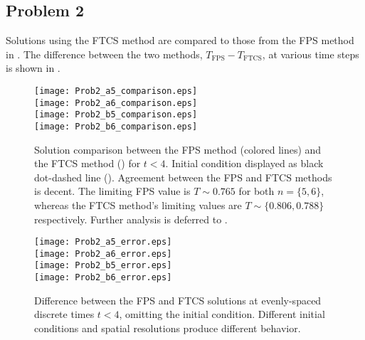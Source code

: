 \documentclass[11pt]{article}
\begin{document}
\subsection{Problem 2}

Solutions using the FTCS method are compared to those from the FPS method in . The difference between the two methods, $T_\text{FPS} - T_\text{FTCS}$, at various time steps is shown in .

\begin{figure}[p!]
\begin{center}
\texttt{[image: Prob2\_a5\_comparison.eps]} \\
\texttt{[image: Prob2\_a6\_comparison.eps]} \\
\texttt{[image: Prob2\_b5\_comparison.eps]} \\
\texttt{[image: Prob2\_b6\_comparison.eps]}
\\[0.5cm]
\caption{Solution comparison between the FPS method (colored lines) and the FTCS method (\dashrule) for $t<4$. Initial condition displayed as black dot-dashed line (\dotdashrule). Agreement between the FPS and FTCS methods is decent. The limiting FPS value is $T \sim 0.765$ for both $n=\{5,6\}$, whereas the FTCS method's limiting values are $T \sim \{0.806, 0.788\}$ respectively. Further analysis is deferred to .}
\label{fig:Prob2_comparison}
\end{center}
\end{figure}

\begin{figure}[p!]
\begin{center}
\texttt{[image: Prob2\_a5\_error.eps]} \\
\texttt{[image: Prob2\_a6\_error.eps]} \\
\texttt{[image: Prob2\_b5\_error.eps]} \\
\texttt{[image: Prob2\_b6\_error.eps]}
\\[0.5cm]
\caption{Difference between the FPS and FTCS solutions at evenly-spaced discrete times $t<4$, omitting the initial condition. Different initial conditions and spatial resolutions produce different behavior.}
\label{fig:Prob2_error}
\end{center}
\end{figure}

\end{document}

